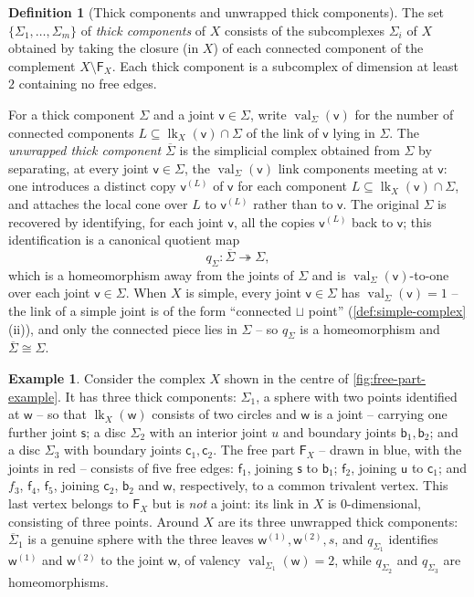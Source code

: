 \documentclass[reqno]{amsart}
\theoremstyle{definition}
\newtheorem{definition}[theorem]{Definition}
\newtheorem{example}[theorem]{Example}
\newcommand\sfb{\mathsf{b}}
\newcommand\sfc{\mathsf{c}}
\newcommand\sff{\mathsf{f}}
\newcommand\sfs{\mathsf{s}}
\newcommand\sfu{\mathsf{u}}
\newcommand\sfv{\mathsf{v}}
\newcommand\sfw{\mathsf{w}}
\renewcommand{\bar}{\overline}
\DeclareMathOperator{\lk}{lk}
\DeclareMathOperator{\val}{val}
\numberwithin{equation}{section}
\begin{document}
\begin{definition}[Thick components and unwrapped thick components]
\label{def:free-components}
The set \(\{\Sigma_1,\dots,\Sigma_m\}\) of \emph{thick components} of \(X\)
consists of the subcomplexes \(\Sigma_i\) of \(X\) obtained by taking
the closure (in \(X\)) of each connected component of the
complement \(X\setminus\mathsf{F}_X\). Each thick component is a
subcomplex of dimension at least \(2\) containing no free edges.

For a thick component \(\Sigma\) and a joint \(\sfv\in\Sigma\), write
\(\val_\Sigma(\sfv)\) for the number of connected components
\(L\subseteq\lk_X(\sfv)\cap\Sigma\) of the link of \(\sfv\) lying in
\(\Sigma\). The \emph{unwrapped thick component}
\(\bar{\Sigma}\) is the simplicial complex obtained from
\(\Sigma\) by separating, at every joint \(\sfv\in\Sigma\), the
\(\val_\Sigma(\sfv)\) link components meeting at \(\sfv\): one introduces
a distinct copy \(\sfv^{(L)}\) of \(\sfv\) for each component
\(L\subseteq\lk_X(\sfv)\cap\Sigma\), and attaches the local cone over
\(L\) to \(\sfv^{(L)}\) rather than to \(\sfv\). The original \(\Sigma\)
is recovered by identifying, for each joint \(\sfv\), all the copies
\(\sfv^{(L)}\) back to \(\sfv\); this identification is a canonical
quotient map
\[
q_\Sigma\colon\bar{\Sigma}\twoheadrightarrow\Sigma,
\]
which is a homeomorphism away from the joints of \(\Sigma\) and is
\(\val_\Sigma(\sfv)\)-to-one over each joint \(\sfv\in\Sigma\). When \(X\)
is simple, every joint \(\sfv\in\Sigma\) has \(\val_\Sigma(\sfv)=1\) --
the link of a simple joint is of the form ``connected
\(\sqcup\) point'' (\cref{def:simple-complex}(ii)), and
only the connected piece lies in \(\Sigma\) -- so \(q_\Sigma\) is a
homeomorphism and \(\bar{\Sigma}\cong\Sigma\).
\end{definition}

\begin{example}\label{ex:free-part-unwrapped}
Consider the complex \(X\) shown in the centre of
\cref{fig:free-part-example}. It has three thick components:
\(\Sigma_1\), a sphere with two points identified at \(\sfw\) --
so that \(\lk_X(\sfw)\) consists of two circles and \(\sfw\) is a
joint -- carrying one further joint \(\sfs\); a disc \(\Sigma_2\)
with an interior joint \(u\) and boundary joints \(\sfb_1,\sfb_2\);
and a disc \(\Sigma_3\) with boundary joints \(\sfc_1,\sfc_2\). The
free part \(\mathsf{F}_X\) -- drawn in blue, with the joints in
red -- consists of five free edges: \(\sff_1\), joining \(\sfs\) to
\(\sfb_1\); \(\sff_2\), joining \(\sfu\) to \(\sfc_1\); and \(f_3\),
\(\sff_4\), \(\sff_5\), joining \(\sfc_2\), \(\sfb_2\) and \(\sfw\),
respectively, to a common trivalent vertex. This last vertex
belongs to \(\mathsf{F}_X\) but is \emph{not} a joint: its link
in \(X\) is \(0\)-dimensional, consisting of three points.
Around \(X\) are its three unwrapped thick components:
\(\bar{\Sigma}_1\) is a genuine sphere with the three
leaves \(\sfw^{(1)},\sfw^{(2)},s\), and \(q_{\Sigma_1}\) identifies
\(\sfw^{(1)}\) and \(\sfw^{(2)}\) to the joint \(\sfw\), of valency
\(\val_{\Sigma_1}(\sfw)=2\), while \(q_{\Sigma_2}\) and
\(q_{\Sigma_3}\) are homeomorphisms.
\end{example}
\end{document}
